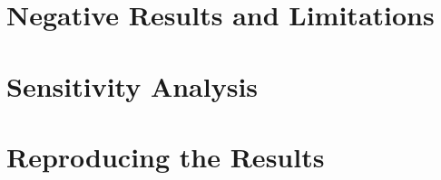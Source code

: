 \section{Negative Results and Limitations}
\label{vol1:sec:results:negative}


\section{Sensitivity Analysis}
\label{vol1:sec:results:sensitivity}


\section{Reproducing the Results}
\label{vol1:sec:results:reproduce}

